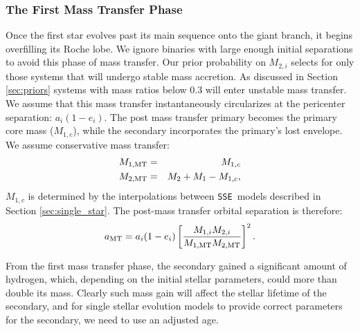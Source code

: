 \documentclass[usenatbib]{mnras}
\newcommand{\sse}{{\tt SSE}}
\begin{document}
\subsubsection{The First Mass Transfer Phase} \label{sec:trans_MT}

Once the first star evolves past its main sequence onto the giant branch, it begins overfilling its Roche lobe. We ignore binaries with large enough initial separations to avoid this phase of mass transfer. Our prior probability on $M_{2,i}$ selects for only those systems that will undergo stable mass accretion. As discussed in Section \ref{sec:priors} systems with mass ratios below 0.3 will enter unstable mass transfer. We assume that this mass transfer instantaneously circularizes at the pericenter separation: $a_i (1-e_i)$. The post mass transfer primary becomes the primary core mass ($M_{1,c}$), while the secondary incorporates the primary's lost envelope. We assume conservative mass transfer:
\begin{eqnarray} 
M_{\rm 1, MT} &=& M_{1,c} \\
M_{\rm 2, MT} &=& M_2 + M_1 - M_{1,c},
\end{eqnarray}
$M_{1,c}$ is determined by the interpolations between \sse\ models described in Section \ref{sec:single_star}. The post-mass transfer orbital separation is therefore:
\begin{equation}
a_{\rm MT} = a_i (1-e_i) \left[ \frac{M_{1,i} M_{2,i}}{M_{\rm 1, MT} M_{\rm 2, MT}} \right]^2.
\end{equation}



From the first mass transfer phase, the secondary gained a significant amount of hydrogen, which, depending on the initial stellar parameters, could more than double its mass. Clearly such mass gain will affect the stellar lifetime of the secondary, and for single stellar evolution models to provide correct parameters for the secondary, we need to use an adjusted age. 
\end{document}
